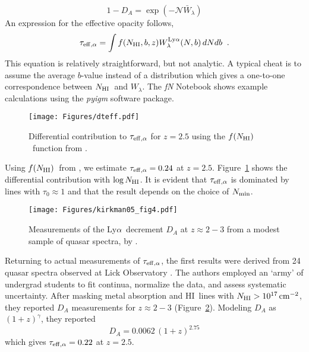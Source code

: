 \documentclass[graybox]{svmult}
\newcommand{\HI}{H{\sc I}}
\def\lya{Ly$\alpha$}
\newcommand{\mnhi}{N_{\rm HI}}
\newcommand{\nhi}{$\mnhi$}
\def\cm#1{\, {\rm cm^{#1}}}
\def\mfnhi{f(\mnhi)}
\def\fnhi{$\mfnhi$}
\begin{document}
\begin{equation}
1-D_A = \exp (-\mathcal{N} \bar W_\lambda)
\end{equation}
An expression for the effective opacity follows, 
\begin{equation}
\tau_{\rm eff, \alpha} = \int f(\mnhi,b,z) 
W^{\rm Ly\alpha}_\lambda(N,b) \, dN db  \;\; .
\label{eqn:teff}
\end{equation}
This equation is relatively straightforward, but
not analytic.
A typical cheat is to assume the average $b$-value instead
of a distribution which
gives a one-to-one correspondence between \nhi\ and $W_\lambda$.
The {\it fN} Notebook shows example calculations using
the {\it pyigm} software package.

%
\begin{figure}[b]
\sidecaption
\texttt{[image: Figures/dteff.pdf]}
%
%
\caption{Differential contribution to 
$\tau_{\rm eff, \alpha}$ for $z=2.5$ using the
\fnhi\ function from \cite{p+14}.
}
\label{fig:dteff}       %
\end{figure}

Using \fnhi\ from \cite{p+14}, %
we estimate $\tau_{\rm eff, \alpha} = 0.24$ at $z=2.5$.
Figure~\ref{fig:dteff} shows the
differential contribution with $\log \mnhi$.
It is evident that $\tau_{\rm eff,\alpha}$
is dominated by lines with $\tau_0 \approx 1$ and
that the result
depends on the choice of $N_{\rm min}$. 

%
\begin{figure}[b]
\sidecaption
\texttt{[image: Figures/kirkman05\_fig4.pdf]}
%
%
\caption{Measurements of the \lya\ decrement
$D_A$ at $z \approx 2-3$ from a modest sample of
quasar spectra, by \cite{k05}.
}
\label{fig:DA}       %
\end{figure}

Returning to actual measurements of $\tau_{\rm eff,\alpha}$,
the first results were derived from
24 quasar spectra observed at Lick Observatory
\cite{kirkman05}.  The authors employed an
`army' of undergrad students to fit continua,
normalize the data, and assess
systematic uncertainty.
After masking metal absorption and \HI\
lines with $\mnhi > 10^{17} \cm{-2}$, they
reported $D_A$ measurements for $z \approx 2-3$
(Figure~\ref{fig:DA}).
Modeling $D_A$ as $(1+z)^\gamma$, they reported 
\begin{equation}
D_A = 0.0062 \, (1+z)^{2.75}
\end{equation}
which gives $\tau_{\rm eff, \alpha} = 0.22$ 
at $z=2.5$.
\end{document}
